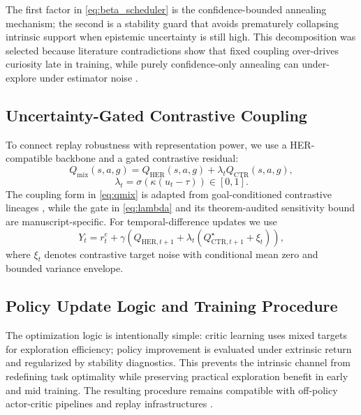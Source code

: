 \documentclass{article} %
\begin{document}
The first factor in \eqref{eq:beta_scheduler} is the confidence-bounded annealing mechanism; the second is a stability guard that avoids prematurely collapsing intrinsic support when epistemic uncertainty is still high. This decomposition was selected because literature contradictions show that fixed coupling over-drives curiosity late in training, while purely confidence-only annealing can under-explore under estimator noise \citep{arxiv1810_12894, arxiv2002_06038, arxiv2602_24081}.

\subsection{Uncertainty-Gated Contrastive Coupling}

To connect replay robustness with representation power, we use a HER-compatible backbone and a gated contrastive residual:
\begin{equation}
\label{eq:qmix}
Q_{\mathrm{mix}}(s,a,g)=Q_{\mathrm{HER}}(s,a,g)+\lambda_t Q_{\mathrm{CTR}}(s,a,g),
\end{equation}
\begin{equation}
\label{eq:lambda}
\lambda_t = \sigma\!\left(\kappa(u_t-\tau)\right)\in[0,1].
\end{equation}
The coupling form in \eqref{eq:qmix} is adapted from goal-conditioned contrastive lineages \citep{arxiv2206_07568, arxiv2603_14887}, while the gate in \eqref{eq:lambda} and its theorem-audited sensitivity bound are manuscript-specific. For temporal-difference updates we use
\begin{equation}
\label{eq:ytarget}
Y_t=r_t^e+\gamma\left(Q_{\mathrm{HER},t+1}+\lambda_t\left(Q_{\mathrm{CTR},t+1}^{\star}+\xi_t\right)\right),
\end{equation}
where $\xi_t$ denotes contrastive target noise with conditional mean zero and bounded variance envelope.

\subsection{Policy Update Logic and Training Procedure}

The optimization logic is intentionally simple: critic learning uses mixed targets for exploration efficiency; policy improvement is evaluated under extrinsic return and regularized by stability diagnostics. This prevents the intrinsic channel from redefining task optimality while preserving practical exploration benefit in early and mid training. The resulting procedure remains compatible with off-policy actor-critic pipelines and replay infrastructures \citep{arxiv1707_01495, arxiv1801_01290, arxiv2206_07568}.
\end{document}
